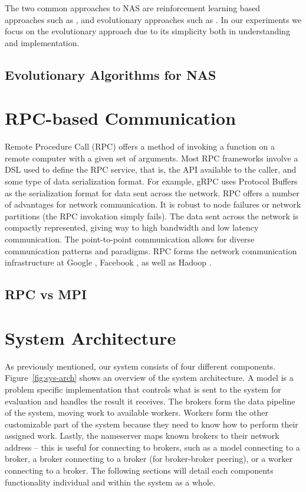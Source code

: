 \documentclass[conference]{IEEEtran}
\begin{document}
The two common approaches to NAS are reinforcement learning based approaches such
as \cite{45826, Kyriakides:2018:NAS:3200947.3208068, pmlr-v80-pham18a}, and
evolutionary approaches such as \cite{DBLP:journals/corr/abs-1711-00436,
  DBLP:journals/corr/MiikkulainenLMR17, DBLP:conf/icml/RealMSSSTLK17}. In our
experiments we focus on the evolutionary approach due to its simplicity both in
understanding and implementation.

\subsection{Evolutionary Algorithms for NAS}


\section{RPC-based Communication}
Remote Procedure Call (RPC) offers a method of invoking a function on a remote
computer with a given set of arguments. Most RPC frameworks involve a DSL used
to define the RPC service, that is, the API available to the caller, and some
type of data serialization format. For example, gRPC uses Protocol Buffers
\cite{Varda2008} as the serialization format for data sent across the network.
RPC offers a number of advantages for network communication. It is robust to
node failures or network partitions (the RPC invokation simply fails). The data
sent across the network is compactly represented, giving way to high bandwidth
and low latency communication. The point-to-point communication allows for
diverse communication patterns and paradigms. RPC forms the network communication
infrastructure at Google \cite{van2017production}, Facebook \cite{Slee2007},
as well as Hadoop
\cite{Shvachko:2010:HDF:1913798.1914427, Lu:2013:HDH:2570457.2571128}.

\subsection{RPC vs MPI}

\section{System Architecture}
As previously mentioned, our system consists of four different components.
Figure~\ref{fig:sys-arch} shows an overview of the system architecture.
A model
is a problem specific implementation that controls what is sent to the system for
evaluation and handles the result it receives. The brokers form the data pipeline
of the system, moving work to available workers. Workers form the other customizable
part of the system because they need to know how to perform their assigned work.
Lastly, the nameserver maps known brokers to their network address -- this is useful
for connecting to brokers, such as a model connecting to a broker, a broker connecting
to a broker (for broker-broker peering), or a worker connecting to a broker. The
following sections will detail each components functionality individual and within
the system as a whole.
\end{document}
